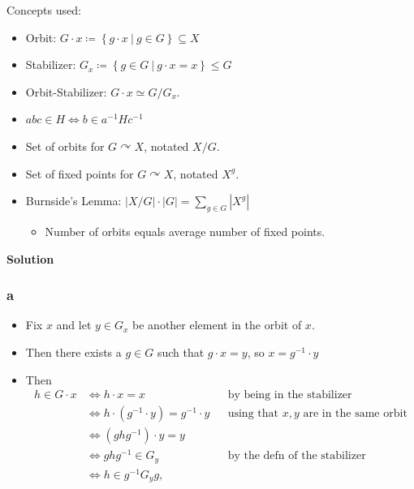 \begin{solution}

Concepts used:

\begin{itemize}
\tightlist
\item
  Orbit:
  \(G\cdot x \coloneqq\left\{{g\cdot x {~\mathrel{\Big|}~}g\in G}\right\} \subseteq X\)
\item
  Stabilizer:
  \(G_x \coloneqq\left\{{g\in G{~\mathrel{\Big|}~}g\cdot x = x}\right\} \leq G\)
\item
  Orbit-Stabilizer: \(G\cdot x \simeq G/G_x\).
\item
  \(abc\in H \iff b\in a^{-1}H c^{-1}\)
\item
  Set of orbits for \(G\curvearrowright X\), notated \(X/G\).
\item
  Set of fixed points for \(G\curvearrowright X\), notated \(X^g\).
\item
  Burnside's Lemma:
  \({\left\lvert {X/G} \right\rvert} \cdot {\left\lvert {G} \right\rvert} = \sum_{g\in G} {\left\lvert {X^g} \right\rvert}\)

  \begin{itemize}
  \tightlist
  \item
    Number of orbits equals average number of fixed points.
  \end{itemize}
\end{itemize}

\textbf{Solution}

\hypertarget{a-18}{%
\subsubsection{a}\label{a-18}}

\begin{itemize}
\tightlist
\item
  Fix \(x\) and let \(y\in G_x\) be another element in the orbit of
  \(x\).
\item
  Then there exists a \(g\in G\) such that \(g\cdot x = y\), so
  \(x = g^{-1}\cdot y\)
\item
  Then
  \begin{align*}
  h \in G\cdot x 
  &\iff h\cdot x = x && \text{by being in the stabilizer} \\
  &\iff h\cdot (g^{-1}\cdot y) = g^{-1}\cdot y && \text{using that $x, y$ are in the same orbit} \\
  &\iff (g h g^{-1}) \cdot y = y \\
  &\iff ghg^{-1}\in G_y && \text{by the defn of the stabilizer}\\
  &\iff h\in g ^{-1}  G_y g
  ,\end{align*}
\end{itemize}


\end{solution}
